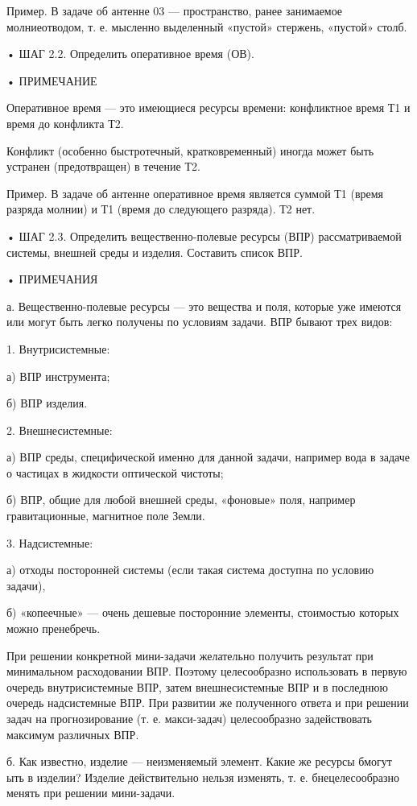 Пример.  В  задаче об  антенне  03  — пространство,  ранее  занимаемое
молниеотводом, т.  е. мысленно выделенный «пустой»  стержень, «пустой»
столб.

• ШАГ 2.2. Определить оперативное время (ОВ).

• ПРИМЕЧАНИЕ

Оперативное время  — это имеющиеся ресурсы  времени: конфликтное время
Т1 и время до конфликта Т2.

Конфликт  (особенно быстротечный,  кратковременный) иногда  может быть
устранен (предотвращен) в течение Т2.

Пример.  В задаче  об  антенне оперативное  время  является суммой  Т1
(время разряда молнии) и Т1 (время до следующего разряда). Т2 нет.


•    ШАГ   2.3.    Определить   вещественно-полевые    ресурсы   (ВПР)
рассматриваемой  системы, внешней  среды и  изделия. Составить  список
ВПР.

• ПРИМЕЧАНИЯ

а.  Вещественно-полевые ресурсы  — это  вещества и  поля, которые  уже
имеются или могут  быть легко получены по условиям  задачи. ВПР бывают
трех видов:

1. Внутрисистемные:

а) ВПР инструмента;

б) ВПР изделия.

2. Внешнесистемные:

а) ВПР среды, специфической именно  для данной задачи, например вода в
задаче о частицах в жидкости оптической чистоты;

б)  ВПР,  общие для  любой  внешней  среды, «фоновые»  поля,  например
гравитационные, магнитное поле Земли.

3. Надсистемные:

а) отходы посторонней системы (если  такая система доступна по условию
задачи),

б)  «копеечные»  —  очень  дешевые  посторонние  элементы,  стоимостью
которых можно пренебречь.

При решении  конкретной мини-задачи желательно получить  результат при
минимальном  расходовании ВПР.  Поэтому  целесообразно использовать  в
первую  очередь внутрисистемные  ВПР,  затем внешнесистемные  ВПР и  в
последнюю  очередь  надсистемные  ВПР.  При  развитии  же  полученного
ответа  и при  решении задач  на прогнозирование  (т. е.  макси-задач)
целесообразно задействовать максимум различных ВПР.

б.  Как известно,  изделие —  неизменяемый элемент.  Какие же  ресурсы
бмогут ыть  в изделии?  Изделие действительно  нельзя изменять,  т. е.
бнецелесообразно менять при решении мини-задачи.

